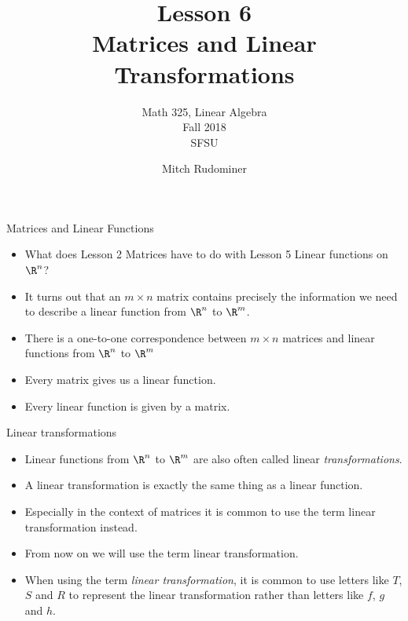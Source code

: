 \documentclass{beamer}
\title{Lesson 6 \\ Matrices and Linear Transformations}
\subtitle{Math 325, Linear Algebra \\ Fall 2018 \\ SFSU}
\author{Mitch Rudominer}
\date{}
\begin{document}
\begin{frame}
  \titlepage
\end{frame}



\begin{frame}{Matrices and Linear Functions}

\begin{itemize}
\item What does Lesson 2 Matrices have to do with Lesson 5 Linear functions on $\R^n$?
\item It turns out that an $m\times n$ matrix contains precisely the information we need
to describe a linear function from $\R^n$ to $\R^m$.
\item There is a one-to-one correspondence between $m\times n$ matrices and linear
functions from $\R^n$ to $\R^m$
\item Every matrix gives us a linear function.
\item Every linear function is given by a matrix.
\end{itemize}

\end{frame}


\begin{frame}{Linear transformations}

\begin{itemize}
\item Linear functions from $\R^n$ to $\R^m$ are also often called
linear \emph{transformations}.
\item A linear transformation is exactly the same thing as a linear function.
\item Especially in the context of matrices it is common to use the term
linear transformation instead.
\item From now on we will use the term linear transformation.
\item When using the term \emph{linear transformation}, it is common to use
letters like $T$, $S$ and $R$ to represent the linear transformation rather
than letters like $f$, $g$ and $h$.
\end{itemize}

\end{frame}

\end{document}
